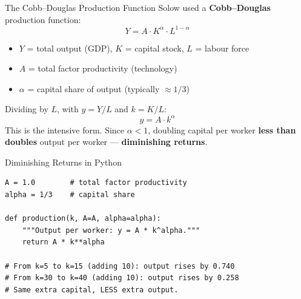 \documentclass[aspectratio=169, 10pt]{beamer}
\begin{document}
\begin{frame}{The Cobb--Douglas Production Function}
Solow used a \textbf{Cobb--Douglas} production function:
\[
  Y = A \cdot K^{\alpha} \cdot L^{1-\alpha}
\]
\begin{itemize}
  \item $Y$ = total output (GDP), \quad $K$ = capital stock,
        \quad $L$ = labour force
  \item $A$ = total factor productivity (technology)
  \item $\alpha$ = capital share of output (typically $\approx 1/3$)
\end{itemize}
\vspace{0.5em}
Dividing by $L$, with $y = Y/L$ and $k = K/L$:
\[
  \boxed{y = A \cdot k^{\alpha}}
\]
This is the \alert{intensive form}. Since $\alpha < 1$, doubling
capital per worker \textbf{less than doubles} output per worker
--- \textbf{diminishing returns}.
\end{frame}

\begin{frame}[fragile]{Diminishing Returns in Python}
\begin{lstlisting}
A = 1.0        # total factor productivity
alpha = 1/3    # capital share

def production(k, A=A, alpha=alpha):
    """Output per worker: y = A * k^alpha."""
    return A * k**alpha

# From k=5 to k=15 (adding 10): output rises by 0.740
# From k=30 to k=40 (adding 10): output rises by 0.258
# Same extra capital, LESS extra output.
\end{lstlisting}
\vspace{0.3em}
\begin{center}
\end{center}
\end{frame}
\end{document}
